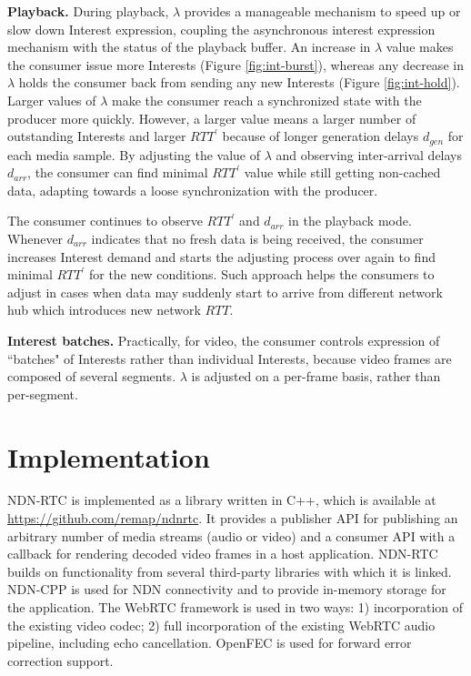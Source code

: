 \documentclass{icn/sig-alternate-2013} %
\newcommand{\ndnrtcName}{NDN-RTC} %
\newcommand{\wConcept}{Interest demand}
\begin{document}

\textbf{Playback.}  During playback, $\lambda$ provides a manageable mechanism to speed up or slow down Interest expression, coupling the asynchronous interest expression mechanism with the status of the playback buffer. An increase in $\lambda$ value makes the consumer issue more Interests (Figure \ref{fig:int-burst}), whereas any decrease in $\lambda$ holds the consumer back from sending any new Interests (Figure \ref{fig:int-hold}). Larger values of $\lambda$ make the consumer reach a synchronized state with the producer more quickly. However, a larger value means a larger number of outstanding Interests and larger $RTT^\prime$ because of longer generation delays $d_{gen}$ for each media sample. By adjusting the value of $\lambda$ and observing inter-arrival delays $d_{arr}$, the consumer can find minimal $RTT^\prime$ value while still getting non-cached data, adapting towards a loose synchronization with the producer.

The consumer continues to observe $RTT^\prime$ and $d_{arr}$ in the playback mode. Whenever $d_{arr}$ indicates that no fresh data is being received, the consumer increases \wConcept{} and starts the adjusting process over again to find minimal $RTT^\prime$ for the new conditions. Such approach helps the consumers to adjust in cases when data may suddenly start to arrive from different network hub which introduces new network $RTT$.

\textbf{Interest batches.} Practically, for video, the consumer controls expression of ``batches" of Interests rather than individual Interests, because video frames are composed of several segments.  $\lambda$ is adjusted on a per-frame basis, rather than per-segment. 

\section{Implementation}
\label{sec:imp}
\ndnrtcName{} is implemented as a library written in C++, which is available at \url{https://github.com/remap/ndnrtc}. 
It provides a publisher API for publishing an arbitrary number of media streams (audio or video) and a consumer API with a callback for rendering decoded video frames in a host application. \ndnrtcName{} builds on functionality from several third-party libraries with which it is linked. NDN-CPP \cite{ndnccl} is used for NDN connectivity and to provide in-memory storage for the application. The WebRTC framework \cite{webrtc} is used in two ways: 1) incorporation of the existing video codec; 2) full incorporation of the existing WebRTC audio pipeline, including echo cancellation. OpenFEC \cite{openfec} is used for forward error correction support. 
\end{document}
